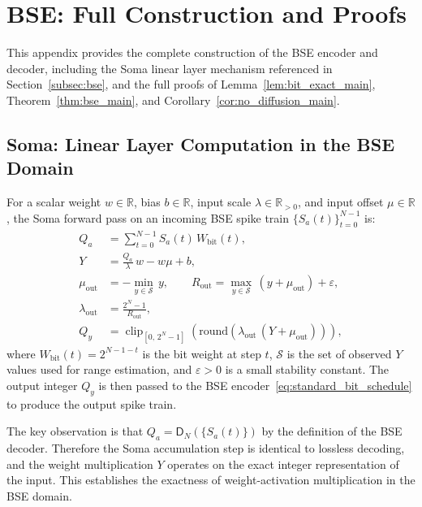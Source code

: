 \documentclass{article}
\theoremstyle{plain}
\theoremstyle{definition}
\theoremstyle{remark}
\begin{document}
\section{BSE: Full Construction and Proofs}
\label{app:bse_entropy_proof}

This appendix provides the complete construction of the BSE encoder and
decoder, including the Soma linear layer mechanism referenced in
Section~\ref{subsec:bse}, and the full proofs of
Lemma~\ref{lem:bit_exact_main}, Theorem~\ref{thm:bse_main}, and
Corollary~\ref{cor:no_diffusion_main}.

\subsection{Soma: Linear Layer Computation in the BSE Domain}
\label{app:soma}

For a scalar weight $w \in \mathbb{R}$, bias $b \in \mathbb{R}$, input scale
$\lambda \in \mathbb{R}_{>0}$, and input offset $\mu \in \mathbb{R}$, the Soma
forward pass on an incoming BSE spike train $\{S_a(t)\}_{t=0}^{N-1}$ is:
\begin{equation}
\label{eq:soma_def_app}
\begin{aligned}
Q_a &= \sum_{t=0}^{N-1} S_a(t)\,W_{\mathrm{bit}}(t), \\
Y   &= \frac{Q_a}{\lambda}\,w - w\mu + b, \\
\mu_{\mathrm{out}} &= -\min_{y \in \mathcal{S}}\,y,
\qquad
R_{\mathrm{out}} = \max_{y \in \mathcal{S}}\,(y + \mu_{\mathrm{out}}) + \varepsilon, \\
\lambda_{\mathrm{out}} &= \frac{2^N - 1}{R_{\mathrm{out}}}, \\
Q_y &= \operatorname{clip}_{[0,\,2^N-1]}\!\left(
         \mathrm{round}\!\left(\lambda_{\mathrm{out}}\,(Y + \mu_{\mathrm{out}})\right)
       \right),
\end{aligned}
\end{equation}
where $W_{\mathrm{bit}}(t) = 2^{N-1-t}$ is the bit weight at step $t$,
$\mathcal{S}$ is the set of observed $Y$ values used for range estimation, and
$\varepsilon > 0$ is a small stability constant. The output integer $Q_y$ is
then passed to the BSE encoder~\eqref{eq:standard_bit_schedule} to produce the
output spike train.

The key observation is that $Q_a = \mathsf{D}_N(\{S_a(t)\})$ by the definition
of the BSE decoder. Therefore the Soma accumulation step is identical to
lossless decoding, and the weight multiplication $Y$ operates on the exact
integer representation of the input. This establishes the exactness of
weight-activation multiplication in the BSE domain.
\end{document}
